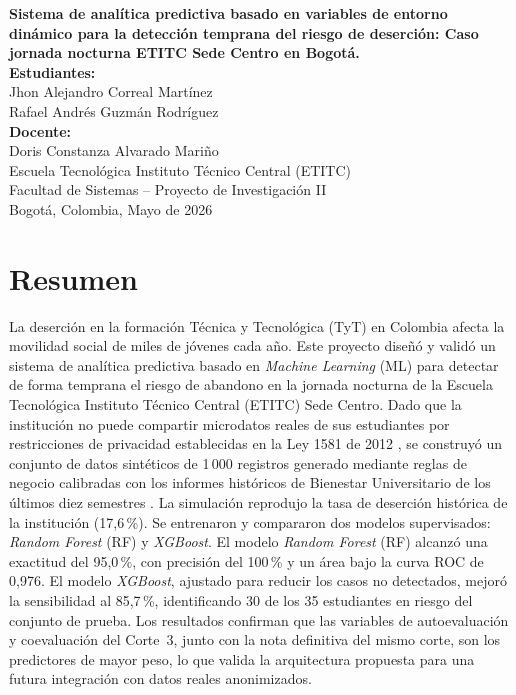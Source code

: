 \documentclass[12pt,letterpaper]{article}
\newcommand{\ML}{\textit{Machine Learning} (ML)\xspace}
\newcommand{\RF}{\textit{Random Forest} (RF)\xspace}
\newcommand{\XGB}{\textit{XGBoost}\xspace}
\newcommand{\ETITC}{Escuela Tecnológica Instituto Técnico Central (ETITC)\xspace}
\newcommand{\TyT}{Técnica y Tecnológica (TyT)\xspace}
\begin{document}
\begin{titlepage}
  \centering
  \vspace*{1cm}
  {\Large \textbf{Sistema de analítica predictiva basado en variables de
  entorno dinámico para la detección temprana del riesgo de deserción:
  Caso jornada nocturna ETITC Sede Centro en Bogotá.}}\\[2cm]

  \textbf{Estudiantes:}\\
  Jhon Alejandro Correal Martínez\\
  Rafael Andrés Guzmán Rodríguez\\[1.5cm]

  \textbf{Docente:}\\
  Doris Constanza Alvarado Mariño\\[3cm]

  \vfill
  \ETITC\\
  Facultad de Sistemas – Proyecto de Investigación II\\
  Bogotá, Colombia, Mayo de 2026
\end{titlepage}

\newpage
\tableofcontents
\newpage

\section{Resumen}

La deserción en la formación \TyT en Colombia afecta la movilidad social de miles de jóvenes cada año. Este proyecto diseñó y validó un sistema de analítica predictiva basado en \ML para detectar de forma temprana el riesgo de abandono en la jornada nocturna de la \ETITC Sede Centro. Dado que la institución no puede compartir microdatos reales de sus estudiantes por restricciones de privacidad establecidas en la Ley 1581 de 2012 \parencite{ley1581}, se construyó un conjunto de datos sintéticos de 1\,000 registros generado mediante reglas de negocio calibradas con los informes históricos de Bienestar Universitario de los últimos diez semestres \parencite{etitc_bienestar}. La simulación reprodujo la tasa de deserción histórica de la institución (17,6\,\%). Se entrenaron y compararon dos modelos supervisados: \RF y \XGB. El modelo \RF alcanzó una exactitud del 95,0\,\%, con precisión del 100\,\% y un área bajo la curva ROC de 0,976. El modelo \XGB, ajustado para reducir los casos no detectados, mejoró la sensibilidad al 85,7\,\%, identificando 30 de los 35 estudiantes en riesgo del conjunto de prueba. Los resultados confirman que las variables de autoevaluación y coevaluación del Corte~3, junto con la nota definitiva del mismo corte, son los predictores de mayor peso, lo que valida la arquitectura propuesta para una futura integración con datos reales anonimizados.
\end{document}
